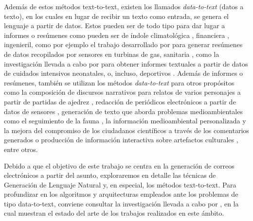 Además de estos métodos text-to-text, existen los llamados \textit{data-to-text} (datos a texto), en los cuales en lugar de recibir un texto como entrada, se genera el lenguaje a partir de datos. Estos pueden ser de todo tipo para dar lugar a informes o resúmenes como pueden ser de índole climatológica \citep{goldberg1994using, ramos2014linguistic}, financiera \citep{plachouras2016interacting}, ingenieril, como por ejemplo el trabajo desarrollado por \cite{yu2007choosing} para generar resúmenes de datos recopilados por sensores en turbinas de gas, sanitaria \citep{huske2003text, banaee2013towards}, como la investigación llevada a cabo por \cite{portet2009automatic} para obtener informes textuales a partir de datos de cuidados intensivos neonatales, o, incluso, deportivos \citep{theune2001data, chen2008learning}. Además de informes o resúmenes, también se utilizan los métodos \textit{data-to-text} para otros propósitos como la composición de discursos narrativos para relatos de varios personajes a partir de partidas de ajedrez \citep{gervas2014composing}, redacción de periódicos electrónicos a partir de datos de sensores \citep{molina2011generating}, generación de texto que aborda problemas medioambientales como el seguimiento de la fauna \citep{siddharthan2012blogging, ponnamperuma2013tag2blog}, la información medioambiental personalizada \citep{wanner2015getting} y la mejora del compromiso de los ciudadanos científicos a través de los comentarios generados \citep{van2016role} o producción de información interactiva sobre artefactos culturales \citep{stock2007adaptive}, entre otros.

Debido a que el objetivo de este trabajo se centra en la generación de correos electrónicos a partir del asunto, exploraremos en detalle las técnicas de Generación de Lenguaje Natural y, en especial, los métodos text-to-text. Para profundizar en los algoritmos y arquitecturas empleados ante los problemas de tipo data-to-text, conviene consultar la investigación llevada a cabo por \cite{gatt2018survey}, en la cual muestran el estado del arte de los trabajos realizados en este ámbito.

